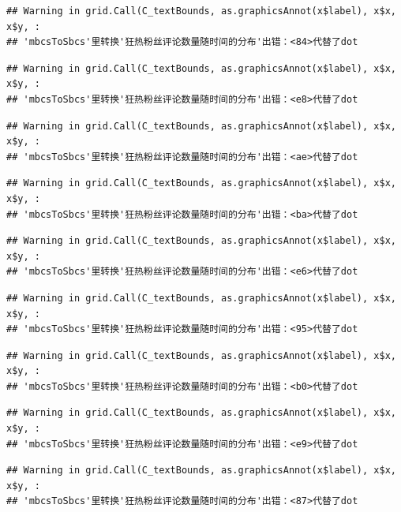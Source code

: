 \documentclass[
]{article}
\begin{document}
\begin{verbatim}
## Warning in grid.Call(C_textBounds, as.graphicsAnnot(x$label), x$x, x$y, :
## 'mbcsToSbcs'里转换'狂热粉丝评论数量随时间的分布'出错：<84>代替了dot
\end{verbatim}

\begin{verbatim}
## Warning in grid.Call(C_textBounds, as.graphicsAnnot(x$label), x$x, x$y, :
## 'mbcsToSbcs'里转换'狂热粉丝评论数量随时间的分布'出错：<e8>代替了dot
\end{verbatim}

\begin{verbatim}
## Warning in grid.Call(C_textBounds, as.graphicsAnnot(x$label), x$x, x$y, :
## 'mbcsToSbcs'里转换'狂热粉丝评论数量随时间的分布'出错：<ae>代替了dot
\end{verbatim}

\begin{verbatim}
## Warning in grid.Call(C_textBounds, as.graphicsAnnot(x$label), x$x, x$y, :
## 'mbcsToSbcs'里转换'狂热粉丝评论数量随时间的分布'出错：<ba>代替了dot
\end{verbatim}

\begin{verbatim}
## Warning in grid.Call(C_textBounds, as.graphicsAnnot(x$label), x$x, x$y, :
## 'mbcsToSbcs'里转换'狂热粉丝评论数量随时间的分布'出错：<e6>代替了dot
\end{verbatim}

\begin{verbatim}
## Warning in grid.Call(C_textBounds, as.graphicsAnnot(x$label), x$x, x$y, :
## 'mbcsToSbcs'里转换'狂热粉丝评论数量随时间的分布'出错：<95>代替了dot
\end{verbatim}

\begin{verbatim}
## Warning in grid.Call(C_textBounds, as.graphicsAnnot(x$label), x$x, x$y, :
## 'mbcsToSbcs'里转换'狂热粉丝评论数量随时间的分布'出错：<b0>代替了dot
\end{verbatim}

\begin{verbatim}
## Warning in grid.Call(C_textBounds, as.graphicsAnnot(x$label), x$x, x$y, :
## 'mbcsToSbcs'里转换'狂热粉丝评论数量随时间的分布'出错：<e9>代替了dot
\end{verbatim}

\begin{verbatim}
## Warning in grid.Call(C_textBounds, as.graphicsAnnot(x$label), x$x, x$y, :
## 'mbcsToSbcs'里转换'狂热粉丝评论数量随时间的分布'出错：<87>代替了dot
\end{verbatim}
\end{document}

